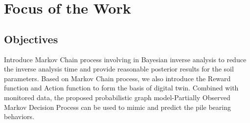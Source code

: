 \chapter{Focus of the Work}
\label{ch:Focus}

\section{Objectives}

Introduce Markov Chain process involving in Bayesian inverse analysis to reduce the inverse analysis time and provide reasonable posterior results for the soil parameters. Based on Markov Chain process, we also introduce the Reward function and Action function to form the basis of digital twin. Combined with monitored data, the proposed probabilistic graph model-Partially Observed Markov Decision Process can be used to mimic and predict the pile bearing behaviors.


